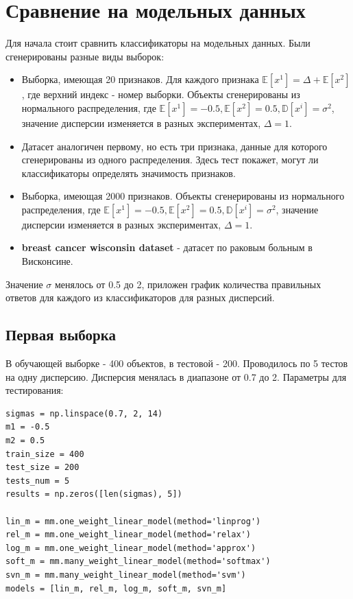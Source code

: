 \documentclass[a4paper]{article}
\newcommand{\E}{\mathbb{E}}
\begin{document}
\section{Сравнение на модельных данных}

Для начала стоит сравнить классификаторы на модельных данных. Были сгенерированы разные виды выборок:
\begin{itemize}
\item Выборка, имеющая 20 признаков. Для каждого признака $\E[x^1] = \Delta + \E[x^2]$, где верхний индекс - номер выборки. Объекты сгенерированы из нормального распределения, где $\E[x^1] = -0.5, \E[x^2] = 0.5, \mathbb{D}[x^i] = \sigma^2$, значение дисперсии изменяется в разных экспериментах, $\Delta = 1$.
\item Датасет аналогичен первому, но есть три признака, данные для которого сгенерированы из одного распределения. Здесь тест покажет, могут ли классификаторы определять значимость признаков.
\item Выборка, имеющая 2000 признаков.  Объекты сгенерированы из нормального распределения, где $\E[x^1] = -0.5, \E[x^2] = 0.5, \mathbb{D}[x^i] = \sigma^2$, значение дисперсии изменяется в разных экспериментах, $\Delta = 1$.
\item \textbf{breast cancer wisconsin dataset} - датасет по раковым больным в Висконсине.
\end{itemize}
Значение $\sigma$ менялось от 0.5 до 2, приложен график количества правильных ответов для каждого из классификаторов для разных дисперсий.

\subsection{Первая выборка}
В обучающей выборке - 400 объектов, в тестовой - 200. Проводилось по 5 тестов на одну дисперсию. Дисперсия менялась в диапазоне от 0.7 до 2. Параметры для тестирования:
\begin{lstlisting}
sigmas = np.linspace(0.7, 2, 14)
m1 = -0.5
m2 = 0.5
train_size = 400
test_size = 200
tests_num = 5
results = np.zeros([len(sigmas), 5])

lin_m = mm.one_weight_linear_model(method='linprog')
rel_m = mm.one_weight_linear_model(method='relax')
log_m = mm.one_weight_linear_model(method='approx')
soft_m = mm.many_weight_linear_model(method='softmax')
svn_m = mm.many_weight_linear_model(method='svm')
models = [lin_m, rel_m, log_m, soft_m, svn_m]
\end{lstlisting}
\end{document}
